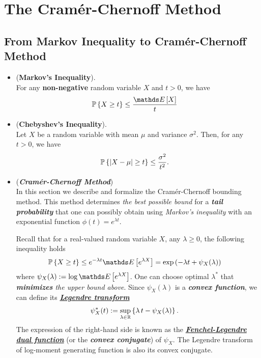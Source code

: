 \documentclass[11pt]{article}
\begin{document}
\newpage
\section{The Cram{\'e}r-Chernoff Method}
\subsection{From Markov Inequality to Cram\'er-Chernoff Method}
\begin{itemize}
\item 
\begin{proposition} (\textbf{Markov's Inequality}). \citep{vershynin2018high}\\
For any \textbf{non-negative} random variable $X$ and $t > 0$, we have
\begin{align}
\bP\set{X \ge t} &\le \frac{\E{}{X}}{t} \label{ineqn: markov_inequality}
\end{align}
\end{proposition}

\item \begin{proposition} (\textbf{Chebyshev's Inequality}). \citep{vershynin2018high}\\
Let $X$ be a random variable with mean $\mu$ and variance $\sigma^2$. Then, for any $t > 0$, we have
\begin{align}
{\mathbb P}\left\{\left\lvert X - \mu \right\rvert \ge t\right\} &\le \frac{\sigma^2}{t^2}. \label{ineqn: chebyshev_inequality}
\end{align}
\end{proposition}

\item \begin{remark}(\textbf{\emph{Cram\'er-Chernoff Method}})\\
In this section we describe and formalize the Cram{\'e}r-Chernoff bounding method. This method determines \emph{the best possible bound} for a \emph{\textbf{tail probability}} that one can possibly obtain using \emph{Markov's inequality} with an exponential function $\phi(t) = e^{\lambda t}$.

Recall that for a real-valued random variable $X$, any $\lambda \ge 0$, the following inequality holds
\begin{align*}
\bP\set{X \ge t} &\le e^{-\lambda t} \E{}{e^{\lambda X}} = \exp\paren{-\lambda t + \psi_{X}(\lambda) }
\end{align*} where $\psi_{X}(\lambda) := \log   \E{}{e^{\lambda X}}$. One can choose optimal $\lambda^{*}$ that \emph{\textbf{minimizes} the upper bound above}.
Since $\psi_{X}(\lambda)$ is a \emph{\textbf{convex function}}, we can define its \underline{\emph{\textbf{Legendre transform}}}
\begin{align*}
\psi^{*}_{X}(t) &:= \sup_{\lambda \in {\mathbb R}}\left\{\lambda\,t - \psi_{X}(\lambda)\right\}.
\end{align*} The expression of the right-hand side is known as the \underline{\emph{\textbf{Fenchel-Legendre dual function}}} (or the \textbf{\emph{convex conjugate}}) of $\psi_{X}$. The Legendre transform of log-moment generating function is also its convex conjugate. %


\end{remark}
\end{itemize}
\end{document}
